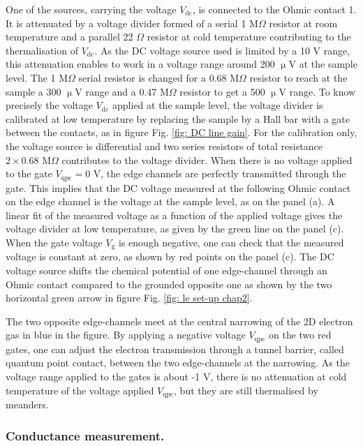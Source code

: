 One of the sources, carrying the voltage $V_{\mathrm{dc}}$, is connected to the Ohmic contact 1. 
It is attenuated by a voltage divider formed of a serial 1 M$\Omega$ resistor at room temperature and a parallel 22 $\Omega$ resistor at cold temperature contributing to the thermalisation of $V_{\mathrm{dc}}$.
As the DC voltage source used is limited by a 10 V range, this attenuation enables to work in a voltage range around 200 $\upmu$V at the sample level.
The 1 M$\Omega$ serial resistor is changed for a 0.68 M$\Omega$ resistor to reach at the sample a 300 $\upmu$V range and a 0.47 M$\Omega$ resistor to get a 500 $\upmu$V range.
To know precisely the voltage $V_{\mathrm{dc}}$ applied at the sample level, the voltage divider is calibrated at low temperature by replacing the sample by a Hall bar with a gate between the contacts, as in figure Fig. \ref{fig: DC line gain}.
For the calibration only, the voltage source is differential and two series resistors of total resistance $2\times 0.68$ M$\Omega$ contributes to the voltage divider.
When there is no voltage applied to the gate $V_{\mathrm{qpc}} = 0$ V, the edge channels are perfectly transmitted through the gate.
This implies that the DC voltage measured at the following Ohmic contact on the edge channel is the voltage at the sample level, as on the panel (a).
A linear fit of the measured voltage as a function of the applied voltage gives the voltage divider at low temperature, as given by the green line on the panel (c).
When the gate voltage  $V_{\mathrm{g}}$ is enough negative, one can check that the measured voltage is constant at zero, as shown by red points on the panel (c).
The DC voltage source shifts the chemical potential of one edge-channel through an Ohmic contact compared to the grounded opposite one as shown by the two horizontal green arrow in figure Fig. \ref{fig: le set-up chap2}.

The two opposite edge-channels meet at the central narrowing of the 2D electron gas in blue in the figure.
By applying a negative voltage $V_{\mathrm{qpc}}$ on the two red gates, one can adjust the electron transmission through a tunnel barrier, called quantum point contact, between the two edge-channels at the narrowing.
As the voltage range applied to the gates is about -1 V, there is no attenuation at cold temperature of the voltage applied $V_{\mathrm{qpc}}$, but they are still thermalised by meanders.

\subsubsection*{Conductance measurement.}

